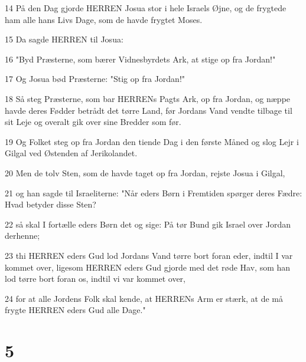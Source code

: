 \par 14 På den Dag gjorde HERREN Josua stor i hele Israels Øjne, og de frygtede ham alle hans Livs Dage, som de havde frygtet Moses.
\par 15 Da sagde HERREN til Josua:
\par 16 "Byd Præsterne, som bærer Vidnesbyrdets Ark, at stige op fra Jordan!"
\par 17 Og Josua bød Præsterne: "Stig op fra Jordan!"
\par 18 Så steg Præsterne, som bar HERRENs Pagts Ark, op fra Jordan, og næppe havde deres Fødder betrådt det tørre Land, før Jordans Vand vendte tilbage til sit Leje og overalt gik over sine Bredder som før.
\par 19 Og Folket steg op fra Jordan den tiende Dag i den første Måned og slog Lejr i Gilgal ved Østenden af Jerikolandet.
\par 20 Men de tolv Sten, som de havde taget op fra Jordan, rejste Josua i Gilgal,
\par 21 og han sagde til Israeliterne: "Når eders Børn i Fremtiden spørger deres Fædre: Hvad betyder disse Sten?
\par 22 så skal I fortælle eders Børn det og sige: På tør Bund gik Israel over Jordan derhenne;
\par 23 thi HERREN eders Gud lod Jordans Vand tørre bort foran eder, indtil I var kommet over, ligesom HERREN eders Gud gjorde med det røde Hav, som han lod tørre bort foran os, indtil vi var kommet over,
\par 24 for at alle Jordens Folk skal kende, at HERRENs Arm er stærk, at de må frygte HERREN eders Gud alle Dage."

\chapter{5}

